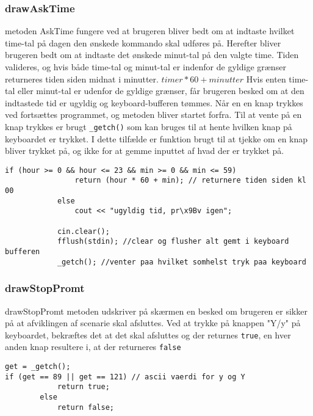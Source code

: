 \subsubsection{drawAskTime}
metoden AskTime fungere ved at brugeren bliver bedt om at indtaste hvilket time-tal på dagen den ønskede kommando skal udføres på. Herefter bliver brugeren bedt om at indtaste det ønskede minut-tal på den valgte time. Tiden valideres, og hvis både time-tal og minut-tal er indenfor de gyldige grænser returneres tiden siden midnat i minutter. $timer*60+minutter$ 
Hvis enten time-tal eller minut-tal er udenfor de gyldige grænser, får brugeren besked om at den indtastede tid er ugyldig og keyboard-bufferen tømmes. Når en en knap trykkes ved fortsættes programmet, og metoden bliver startet forfra. Til at vente på en knap trykkes er brugt \texttt{\_getch()} som kan bruges til at hente hvilken knap på keyboardet er trykket. I dette tilfælde er funktion brugt til at tjekke om en knap bliver trykket på, og ikke for at gemme inputtet af hvad der er trykket på.
\begin{lstlisting}
if (hour >= 0 && hour <= 23 && min >= 0 && min <= 59)
				return (hour * 60 + min); // returnere tiden siden kl 00
			else
				cout << "ugyldig tid, pr\x9Bv igen";
			
			cin.clear();
			fflush(stdin); //clear og flusher alt gemt i keyboard bufferen
			_getch(); //venter paa hvilket somhelst tryk paa keyboard
\end{lstlisting}


\subsubsection{drawStopPromt}
drawStopPromt metoden udskriver på skærmen en besked om brugeren er sikker på at afviklingen af scenarie skal afsluttes. Ved at trykke på knappen "Y/y" på keyboardet, bekræftes det at det skal afsluttes og der returnes \texttt{true}, en hver anden knap resultere i, at der returneres \texttt{false}
\begin{lstlisting}
get = _getch();
if (get == 89 || get == 121) // ascii vaerdi for y og Y
			return true;
		else
			return false;
\end{lstlisting}

\clearpage